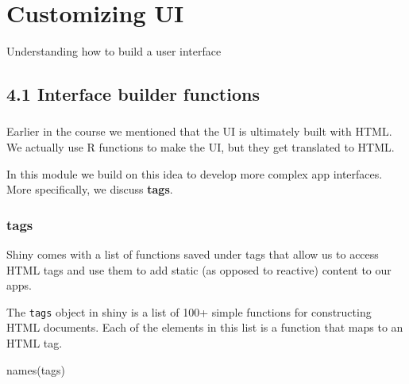 \documentclass[
  letterpaper,
  DIV=11,
  numbers=noendperiod]{scrreprt}
\newenvironment{Shaded}{\begin{snugshade}}{\end{snugshade}}
\newcommand{\FunctionTok}[1]{\textcolor[rgb]{0.28,0.35,0.67}{#1}}
\newcommand{\NormalTok}[1]{\textcolor[rgb]{0.00,0.46,0.62}{#1}}
\begin{document}
\hypertarget{customizing-ui}{%
\chapter{Customizing UI}\label{customizing-ui}}

Understanding how to build a user interface

\hypertarget{interface-builder-functions}{%
\section{4.1 Interface builder
functions}\label{interface-builder-functions}}

\hypertarget{section-58}{%
\subsection{}\label{section-58}}

Earlier in the course we mentioned that the UI is ultimately built with
HTML. We actually use R functions to make the UI, but they get
translated to HTML.

In this module we build on this idea to develop more complex app
interfaces. More specifically, we discuss \textbf{tags}.

\hypertarget{tags}{%
\subsection{tags}\label{tags}}

Shiny comes with a list of functions saved under tags that allow us to
access HTML tags and use them to add static (as opposed to reactive)
content to our apps.

The \texttt{tags} object in shiny is a list of 100+ simple functions for
constructing HTML documents. Each of the elements in this list is a
function that maps to an HTML tag.

\begin{Shaded}
\begin{Highlighting}[]
\FunctionTok{names}\NormalTok{(tags)}
\end{Highlighting}
\end{Shaded}
\end{document}
